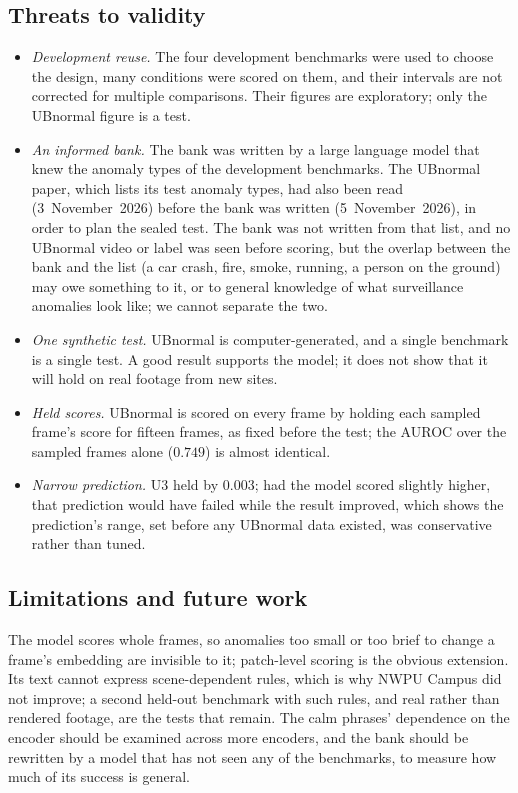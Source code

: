 \documentclass[a4paper,fleqn]{cas-sc}
\begin{document}
\subsection{Threats to validity}
\label{sec:threats}
\begin{itemize}
  \item \emph{Development reuse.} The four development benchmarks were used to choose
        the design, many conditions were scored on them, and their intervals are not
        corrected for multiple comparisons. Their figures are exploratory; only the
        UBnormal figure is a test.
  \item \emph{An informed bank.} The bank was written by a large language model that
        knew the anomaly types of the development benchmarks. The UBnormal paper, which
        lists its test anomaly types, had also been read (3~November~2026) before the
        bank was written (5~November~2026), in order to plan the sealed test. The bank
        was not written from that list, and no UBnormal video or label was seen before
        scoring, but the overlap between the bank and the list (a car crash, fire,
        smoke, running, a person on the ground) may owe something to it, or to general
        knowledge of what surveillance anomalies look like; we cannot separate the two.
  \item \emph{One synthetic test.} UBnormal is computer-generated, and a single
        benchmark is a single test. A good result supports the model; it does not show
        that it will hold on real footage from new sites.
  \item \emph{Held scores.} UBnormal is scored on every frame by holding each sampled
        frame's score for fifteen frames, as fixed before the test; the AUROC over the
        sampled frames alone ($0.749$) is almost identical.
  \item \emph{Narrow prediction.} U3 held by $0.003$; had the model scored slightly
        higher, that prediction would have failed while the result improved, which
        shows the prediction's range, set before any UBnormal data existed, was
        conservative rather than tuned.
\end{itemize}

\subsection{Limitations and future work}
The model scores whole frames, so anomalies too small or too brief to change a frame's
embedding are invisible to it; patch-level scoring is the obvious extension. Its text
cannot express scene-dependent rules, which is why NWPU Campus did not improve; a
second held-out benchmark with such rules, and real rather than rendered footage, are
the tests that remain. The calm phrases' dependence on the encoder should be examined
across more encoders, and the bank should be rewritten by a model that has not seen
any of the benchmarks, to measure how much of its success is general.
\end{document}
